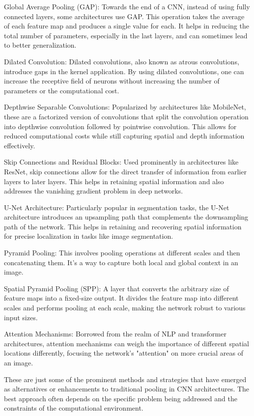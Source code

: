     Global Average Pooling (GAP): Towards the end of a CNN, instead of using fully connected layers, some architectures use GAP. This operation takes the average of each feature map and produces a single value for each. It helps in reducing the total number of parameters, especially in the last layers, and can sometimes lead to better generalization.

    Dilated Convolution: Dilated convolutions, also known as atrous convolutions, introduce gaps in the kernel application. By using dilated convolutions, one can increase the receptive field of neurons without increasing the number of parameters or the computational cost.

    Depthwise Separable Convolutions: Popularized by architectures like MobileNet, these are a factorized version of convolutions that split the convolution operation into depthwise convolution followed by pointwise convolution. This allows for reduced computational costs while still capturing spatial and depth information effectively.

    Skip Connections and Residual Blocks: Used prominently in architectures like ResNet, skip connections allow for the direct transfer of information from earlier layers to later layers. This helps in retaining spatial information and also addresses the vanishing gradient problem in deep networks.

    U-Net Architecture: Particularly popular in segmentation tasks, the U-Net architecture introduces an upsampling path that complements the downsampling path of the network. This helps in retaining and recovering spatial information for precise localization in tasks like image segmentation.

    Pyramid Pooling: This involves pooling operations at different scales and then concatenating them. It's a way to capture both local and global context in an image.

    Spatial Pyramid Pooling (SPP): A layer that converts the arbitrary size of feature maps into a fixed-size output. It divides the feature map into different scales and performs pooling at each scale, making the network robust to various input sizes.

    Attention Mechanisms: Borrowed from the realm of NLP and transformer architectures, attention mechanisms can weigh the importance of different spatial locations differently, focusing the network's "attention" on more crucial areas of an image.

These are just some of the prominent methods and strategies that have emerged as alternatives or enhancements to traditional pooling in CNN architectures. The best approach often depends on the specific problem being addressed and the constraints of the computational environment.




